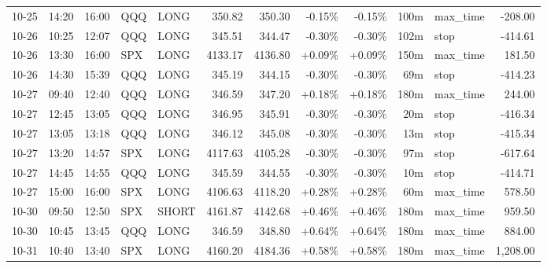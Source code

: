 \documentclass[11pt,a4paper]{article}
\begin{document}
\begin{center}
\begin{longtable}{>{\color{txtmain}}l l l l l r r r r r >{\color{txtmain}}l r}
10-25 & 14:20 & 16:00 & QQQ & LONG & 350.82 & 350.30 & \textcolor{lossred}{-0.15\%} & \textcolor{lossred}{-0.15\%} & 100m & max\_time & \textcolor{lossred}{-208.00} \\
10-26 & 10:25 & 12:07 & QQQ & LONG & 345.51 & 344.47 & \textcolor{lossred}{-0.30\%} & \textcolor{lossred}{-0.30\%} & 102m & stop & \textcolor{lossred}{-414.61} \\
10-26 & 13:30 & 16:00 & SPX & LONG & 4133.17 & 4136.80 & \textcolor{wingreen}{+0.09\%} & \textcolor{wingreen}{+0.09\%} & 150m & max\_time & \textcolor{wingreen}{181.50} \\
10-26 & 14:30 & 15:39 & QQQ & LONG & 345.19 & 344.15 & \textcolor{lossred}{-0.30\%} & \textcolor{lossred}{-0.30\%} & 69m & stop & \textcolor{lossred}{-414.23} \\
10-27 & 09:40 & 12:40 & QQQ & LONG & 346.59 & 347.20 & \textcolor{wingreen}{+0.18\%} & \textcolor{wingreen}{+0.18\%} & 180m & max\_time & \textcolor{wingreen}{244.00} \\
10-27 & 12:45 & 13:05 & QQQ & LONG & 346.95 & 345.91 & \textcolor{lossred}{-0.30\%} & \textcolor{lossred}{-0.30\%} & 20m & stop & \textcolor{lossred}{-416.34} \\
10-27 & 13:05 & 13:18 & QQQ & LONG & 346.12 & 345.08 & \textcolor{lossred}{-0.30\%} & \textcolor{lossred}{-0.30\%} & 13m & stop & \textcolor{lossred}{-415.34} \\
10-27 & 13:20 & 14:57 & SPX & LONG & 4117.63 & 4105.28 & \textcolor{lossred}{-0.30\%} & \textcolor{lossred}{-0.30\%} & 97m & stop & \textcolor{lossred}{-617.64} \\
10-27 & 14:45 & 14:55 & QQQ & LONG & 345.59 & 344.55 & \textcolor{lossred}{-0.30\%} & \textcolor{lossred}{-0.30\%} & 10m & stop & \textcolor{lossred}{-414.71} \\
10-27 & 15:00 & 16:00 & SPX & LONG & 4106.63 & 4118.20 & \textcolor{wingreen}{+0.28\%} & \textcolor{wingreen}{+0.28\%} & 60m & max\_time & \textcolor{wingreen}{578.50} \\
10-30 & 09:50 & 12:50 & SPX & SHORT & 4161.87 & 4142.68 & \textcolor{wingreen}{+0.46\%} & \textcolor{wingreen}{+0.46\%} & 180m & max\_time & \textcolor{wingreen}{959.50} \\
10-30 & 10:45 & 13:45 & QQQ & LONG & 346.59 & 348.80 & \textcolor{wingreen}{+0.64\%} & \textcolor{wingreen}{+0.64\%} & 180m & max\_time & \textcolor{wingreen}{884.00} \\
10-31 & 10:40 & 13:40 & SPX & LONG & 4160.20 & 4184.36 & \textcolor{wingreen}{+0.58\%} & \textcolor{wingreen}{+0.58\%} & 180m & max\_time & \textcolor{wingreen}{1,208.00} \\

\end{longtable}
\end{center}
\end{document}
